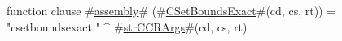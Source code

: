 function clause #\hyperref[sailMIPSzassembly]{assembly}# (#\hyperref[sailMIPSzCSetBoundsExact]{CSetBoundsExact}#(cd, cs, rt)) = "csetboundsexact " ^ #\hyperref[sailMIPSzstrCCRArgs]{strCCRArgs}#(cd, cs, rt)
